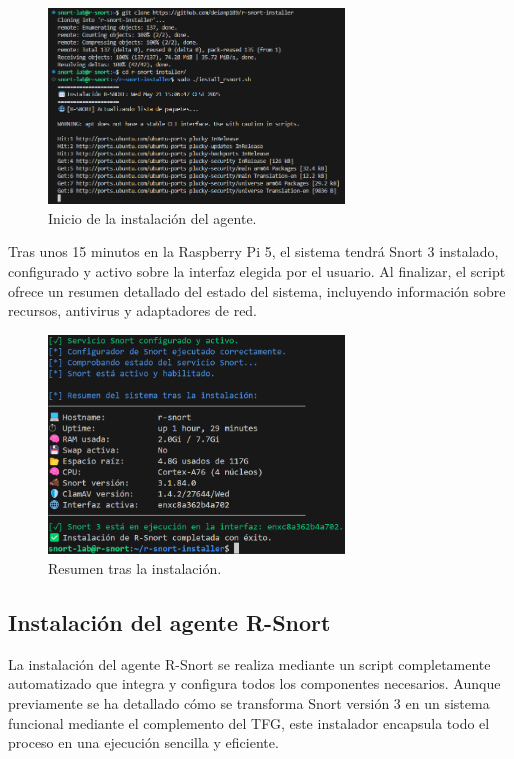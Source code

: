 \documentclass[11pt,a4paper,twoside]{report}
\begin{document}
\begin{figure}[H]
	\centering
	\includegraphics[width=0.7\textwidth]{install/2.png}
	\caption{Inicio de la instalación del agente.}
	\label{fig:inicio-instalacion-rsnort}
\end{figure}

Tras unos 15 minutos en la Raspberry Pi 5, el sistema tendrá Snort 3 instalado, configurado y activo sobre la interfaz elegida por el usuario. Al finalizar, el script ofrece un resumen detallado del estado del sistema, incluyendo información sobre recursos, antivirus y adaptadores de red.

\begin{figure}[H]
	\centering
	\includegraphics[width=0.7\textwidth]{install/3.png}
	\caption{Resumen tras la instalación.}
	\label{fig:resumen-instalacion-rsnort}
\end{figure}


\subsection{Instalación del agente R-Snort}

La instalación del agente R-Snort se realiza mediante un script completamente automatizado que integra y configura todos los componentes necesarios. Aunque previamente se ha detallado cómo se transforma Snort versión 3 en un sistema funcional mediante el complemento del TFG, este instalador encapsula todo el proceso en una ejecución sencilla y eficiente.\newline
\end{document}
